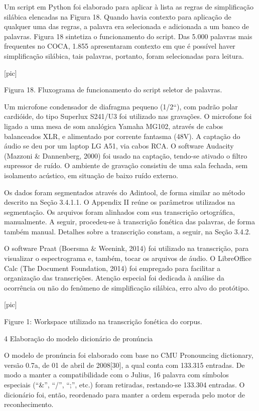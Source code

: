 Um script em Python foi elaborado para aplicar à lista as regras de
simplifica\c{c}\~ao sil\'abica elencadas na Figura 18. Quando havia contexto
para aplica\c{c}\~ao de qualquer uma das regras, a palavra era selecionada e
adicionada a um banco de palavras. Figura 18 sintetiza o funcionamento
do script. Das 5.000 palavras mais frequentes no COCA, 1.855
apresentaram contexto em que \'e poss\'ivel haver simplifica\c{c}\~ao sil\'abica,
tais palavras, portanto, foram selecionadas para leitura.

 [pic]

Figura 18. Fluxograma de funcionamento do script seletor de palavras.

Um microfone condensador de diafragma pequeno (1/2``), com padr\~ao polar
cardi\'oide, do tipo Superlux S241/U3 foi utilizado nas grava\c{c}\~oes. O
microfone foi ligado a uma mesa de som anal\'ogica Yamaha MG102, atrav\'es
de cabos balanceados XLR, e alimentado por corrente fantasma (48V). A
capta\c{c}\~ao do \'audio se deu por um laptop LG A51, via cabos RCA. O software
Audacity (Mazzoni \& Dannenberg, 2000) foi usado na capta\c{c}\~ao, tendo-se
ativado o filtro supressor de ru\'ido. O ambiente de grava\c{c}\~ao consistiu de
uma sala fechada, sem isolamento ac\'ustico, em situa\c{c}\~ao de baixo ru\'ido
externo.

Os dados foram segmentados atrav\'es do Adintool, de forma similar ao
m\'etodo descrito na Se\c{c}\~ao 3.4.1.1. O Appendix II re\'une os par\^ametros
utilizados na segmenta\c{c}\~ao. Os arquivos foram alinhados com sua
transcri\c{c}\~ao ortogr\'afica, manualmente. A seguir, procedeu-se à
transcri\c{c}\~ao fon\'etica das palavras, de forma tamb\'em manual. Detalhes
sobre a transcri\c{c}\~ao constam, a seguir, na Se\c{c}\~ao 3.4.2.

O software Praat (Boersma \& Weenink, 2014) foi utilizado na
transcri\c{c}\~ao, para visualizar o espectrograma e, tamb\'em, tocar os
arquivos de \'audio. O LibreOffice Calc (The Document Foundation, 2014)
foi empregado para facilitar a organiza\c{c}\~ao das transcri\c{c}\~oes. Aten\c{c}\~ao
especial foi dedicada à an\'alise da ocorr\^encia ou n\~ao do fen\^omeno de
simplifica\c{c}\~ao sil\'abica, erro alvo do prot\'otipo.

 [pic]

 Figure 1: Workspace utilizado na transcri\c{c}\~ao fon\'etica do corpus.

4 Elabora\c{c}\~ao do modelo dicion\'ario de pron\'uncia

O modelo de pron\'uncia foi elaborado com base no CMU Pronouncing
dictionary, vers\~ao 0.7a, de 01 de abril de 2008{[}30{]}, a qual conta
com 133.315 entradas. De modo a manter a compatibilidade com o Julius,
16 palavra com s\'imbolos especiais (``\&'', ``/'', ``;'', etc.) foram
retiradas, restando-se 133.304 entradas. O dicion\'ario foi, ent\~ao,
reordenado para manter a ordem esperada pelo motor de reconhecimento.

